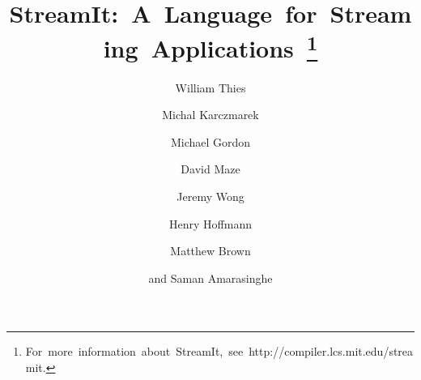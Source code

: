 \documentclass[runningheads]{llncs}
\begin{document}
\pagestyle{headings}

\mainmatter

\title{\mbox{StreamIt:  A Language for Streaming Applications
\thanks{\mbox{For more information about StreamIt, see http://compiler.lcs.mit.edu/streamit.}}}}


\author{William Thies \and Michal Karczmarek \and Michael Gordon \and
David Maze \and Jeremy Wong \and Henry Hoffmann \and Matthew Brown \and
and Saman Amarasinghe}



\maketitle

\begin{abstract}

\end{abstract}




%





%

\end{document}
